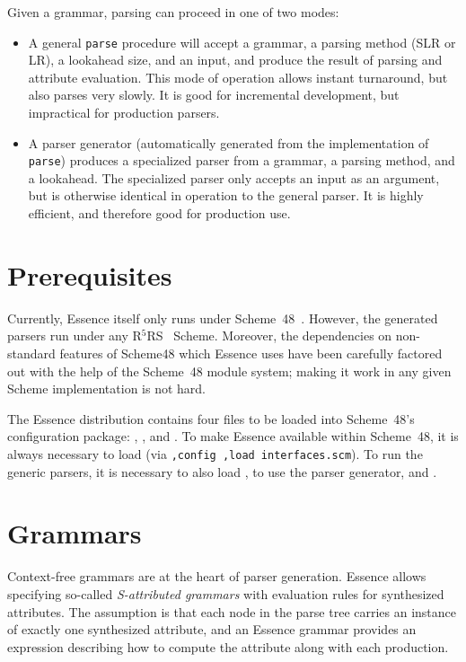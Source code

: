 \documentclass{article}
\newcommand{\codefont}[1]{\texttt{#1}}
\begin{document}
Given a grammar, parsing can proceed in one of two modes:
%
\begin{itemize}
\item A general \codefont{parse} procedure will accept a grammar, a
  parsing method (SLR or LR), a lookahead size, and an input, and
  produce the result of parsing and attribute evaluation.  This mode
  of operation allows instant turnaround, but also parses very
  slowly.  It is good for incremental development, but impractical for
  production parsers.
\item A parser generator (automatically generated from the
  implementation of \codefont{parse}) produces a specialized parser
  from a grammar, a parsing method, and a lookahead.  The specialized
  parser only accepts an input as an argument, but is otherwise
  identical in operation to the general parser.  It is highly
  efficient, and therefore good for production use.
\end{itemize}

\section{Prerequisites}
\label{sec:preliminaries}

Currently, Essence itself only runs under
Scheme~48~\cite{KelseyRees1995}.  However, the generated parsers run
under any R$^5$RS~\cite{KelseyClingerRees1998} Scheme.  Moreover, the
dependencies on non-standard features of Scheme48 which Essence uses
have been carefully factored out with the help of the Scheme~48 module
system; making it work in any given Scheme implementation is not hard.

The Essence distribution contains four files to be loaded into
Scheme~48's configuration package: ,
, and .  To
make Essence available within Scheme~48, it is always necessary to
load  (via \codefont{,config ,load
  interfaces.scm}).  To run the generic parsers, it is necessary to
also load , to use the parser generator,
 and
.

\section{Grammars}
\label{sec:grammars}

Context-free grammars are at the heart of parser generation.  Essence
allows specifying so-called \emph{S-attributed grammars} with
evaluation rules for synthesized attributes.  The assumption is that
each node in the parse tree carries an instance of exactly one
synthesized attribute, and an Essence grammar provides an expression describing 
how to compute the attribute along with each production.
\end{document}
